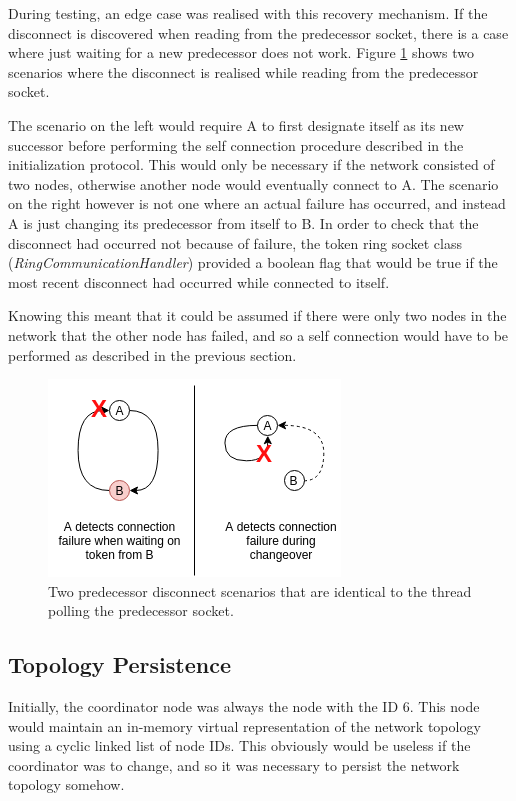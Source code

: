 \documentclass[12pt]{article}
\begin{document}
During testing, an edge case was realised with this recovery mechanism. If the disconnect is discovered when reading from the predecessor socket, there is a case where just waiting for a new predecessor does not work. Figure \ref{fig:hard} shows two scenarios where the disconnect is realised while reading from the predecessor socket. 

The scenario on the left would require A to first designate itself as its new successor before performing the self connection procedure described in the initialization protocol. This would only be necessary if the network consisted of two nodes, otherwise another node would eventually connect to A. The scenario on the right however is not one where an actual failure has occurred, and instead A is just changing its predecessor from itself to B. In order to check that the disconnect had occurred not because of failure, the token ring socket class (\emph{RingCommunicationHandler}) provided a boolean flag that would be true if the most recent disconnect had occurred while connected to itself. 

Knowing this meant that it could be assumed if there were only two nodes in the network that the other node has failed, and so a self connection would have to be performed as described in the previous section.

\begin{figure}[!ht]
	\centering
	\includegraphics[width=0.6\linewidth]{images/hard}
	\caption{Two predecessor disconnect scenarios that are identical to the thread polling the predecessor socket.}
	\label{fig:hard}
\end{figure}

\subsection{Topology Persistence}

Initially, the coordinator node was always the node with the ID 6. This node would maintain an in-memory virtual representation of the network topology using a cyclic linked list of node IDs. This obviously would be useless if the coordinator was to change, and so it was necessary to persist the network topology somehow. 
\end{document}
